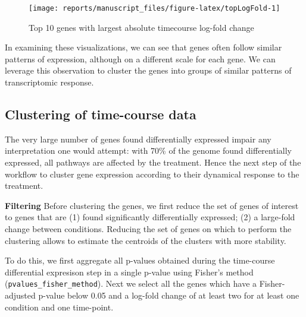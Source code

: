 \documentclass[9pt,a4paper,]{extarticle}
\begin{document}
\begin{figure}[H]

{\centering \texttt{[image: reports/manuscript\_files/figure-latex/topLogFold-1]} 

}

\caption{Top 10 genes with largest absolute timecourse log-fold change}\label{fig:topLogFold}
\end{figure}

In examining these visualizations, we can see that genes often follow similar
patterns of expression, although on a different scale for each gene. We can
leverage this observation to cluster the genes into groups of similar patterns
of transcriptomic response.

\hypertarget{clustering-of-time-course-data}{%
\subsection{Clustering of time-course data}\label{clustering-of-time-course-data}}

The very large number of genes found differentially expressed impair any
interpretation one would attempt: with 70\% of the genome found differentially
expressed, all pathways are affected by the treatment. Hence the next step of
the workflow to cluster gene expression according to their dynamical response
to the treatment.

\textbf{Filtering} Before clustering the genes, we first reduce the set of
genes of interest to genes that are (1) found significantly differentially
expressed; (2) a large-fold change between conditions. Reducing the set of genes on which to perform the clustering allows to
estimate the centroids of the clusters with more stability.

To do this, we first
aggregate all p-values obtained during the time-course differential expresison
step in a single p-value using Fisher's method \citep{fisher:statistical} (\texttt{pvalues\_fisher\_method}).
Next we
select all the genes which have a Fisher-adjusted p-value below 0.05 and a log-fold
change of at least two for at least one condition and one time-point.
\end{document}
